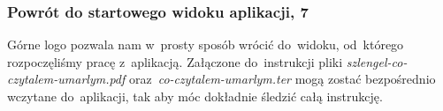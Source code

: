 \documentclass[12pt, a4paper]{article}
\begin{document}
\subsubsection{Powrót do startowego widoku aplikacji, 7}

Górne logo pozwala nam w~prosty sposób wrócić do~widoku, od~którego rozpoczęliśmy pracę z~aplikacją. Załączone do~instrukcji pliki \textit{szlengel-co-czytalem-umarlym.pdf} oraz~\textit{co-czytalem-umarlym.ter} mogą zostać bezpośrednio wczytane do~aplikacji, tak aby móc dokładnie śledzić całą instrukcję.


\end{document}
